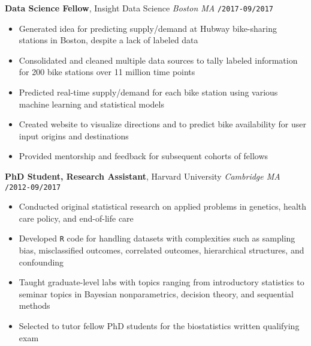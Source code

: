 \documentclass[10pt,english]{report}
\begin{document}
\textbf{Data Science Fellow}, Insight Data Science \hfill \textit{Boston MA} \texttt{/2017-09/2017}
\begin{itemize}
\item Generated idea for predicting supply/demand at Hubway bike-sharing stations in Boston, despite a lack of labeled data
\item Consolidated and cleaned multiple data sources to tally labeled information for 200 bike stations over 11 million time points
\item Predicted real-time supply/demand for each bike station using various machine learning and statistical models
\item Created website to visualize directions and to predict bike availability for user input origins and destinations
\item Provided mentorship and feedback for subsequent cohorts of fellows
\end{itemize}

\vspace{1mm}

\textbf{PhD Student, Research Assistant}, Harvard University \hfill \textit{Cambridge MA} \texttt{/2012-09/2017}
\begin{itemize}
\item Conducted original statistical research on applied problems in genetics, health care policy, and end-of-life care
\item Developed \texttt{R} code for handling datasets with complexities such as sampling bias, misclassified outcomes, correlated outcomes, hierarchical structures, and confounding
\item Taught graduate-level labs with topics ranging from introductory statistics to seminar topics in Bayesian nonparametrics, decision theory, and sequential methods
\item Selected to tutor fellow PhD students for the biostatistics written qualifying exam
\end{itemize}

\vspace{1mm}
\end{document}
